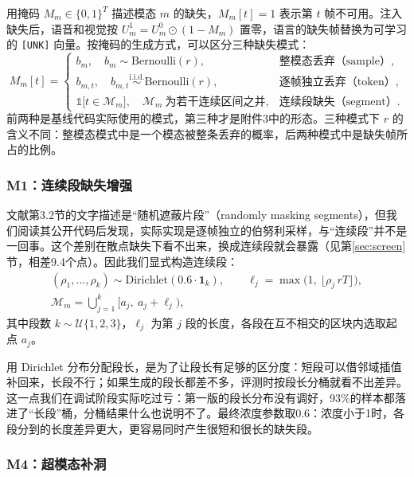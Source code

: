 用掩码 $M_m\in\{0,1\}^T$ 描述模态 $m$ 的缺失，$M_m[t]=1$ 表示第 $t$ 帧不可用。注入缺失后，语音和视觉按 $U_m^1=U_m^0\odot(1-M_m)$ 置零，语言的缺失帧替换为可学习的 \texttt{[UNK]} 向量。按掩码的生成方式，可以区分三种缺失模式：
\begin{equation}\label{eq:modes}
M_m[t]=\begin{cases}
b_m,\quad b_m\sim\mathrm{Bernoulli}(r), & \text{整模态丢弃（sample）},\\[2pt]
b_{m,t},\quad b_{m,t}\overset{\text{i.i.d.}}{\sim}\mathrm{Bernoulli}(r), & \text{逐帧独立丢弃（token）},\\[2pt]
\mathbb{1}\big[t\in\mathcal{M}_m\big],\quad \mathcal{M}_m\ \text{为若干连续区间之并}, & \text{连续段缺失（segment）}.
\end{cases}
\end{equation}
前两种是基线代码实际使用的模式，第三种才是附件3中的形态。三种模式下 $r$ 的含义不同：整模态模式中是一个模态被整条丢弃的概率，后两种模式中是缺失帧所占的比例。

\subsubsection{M1：连续段缺失增强}

文献\cite{shi2026ldsd}第3.2节的文字描述是“随机遮蔽片段”（randomly masking segments），但我们阅读其公开代码后发现，实际实现是逐帧独立的伯努利采样，与“连续段”并不是一回事。这个差别在散点缺失下看不出来，换成连续段就会暴露（见第\ref{sec:screen}节，相差9.4个点）。因此我们显式构造连续段：
\begin{equation}\label{eq:m1}
\begin{gathered}
(\rho_1,\dots,\rho_k)\sim\mathrm{Dirichlet}(0.6\cdot\mathbf{1}_k),\qquad
\ell_j=\max\big(1,\ \lfloor\rho_j\, rT\rfloor\big),\\
\mathcal{M}_m=\bigcup_{j=1}^{k}\big[a_j,\ a_j+\ell_j\big),
\end{gathered}
\end{equation}
其中段数 $k\sim\mathcal{U}\{1,2,3\}$，$\ell_j$ 为第 $j$ 段的长度，各段在互不相交的区块内选取起点 $a_j$。

用 Dirichlet 分布分配段长，是为了让段长有足够的区分度：短段可以借邻域插值补回来，长段不行；如果生成的段长都差不多，评测时按段长分桶就看不出差异。这一点我们在调试阶段实际吃过亏：第一版的段长分布没有调好，93\%的样本都落进了“长段”桶，分桶结果什么也说明不了。最终浓度参数取0.6：浓度小于1时，各段分到的长度差异更大，更容易同时产生很短和很长的缺失段。

\subsubsection{M4：超模态补洞}\label{sec:m4}

